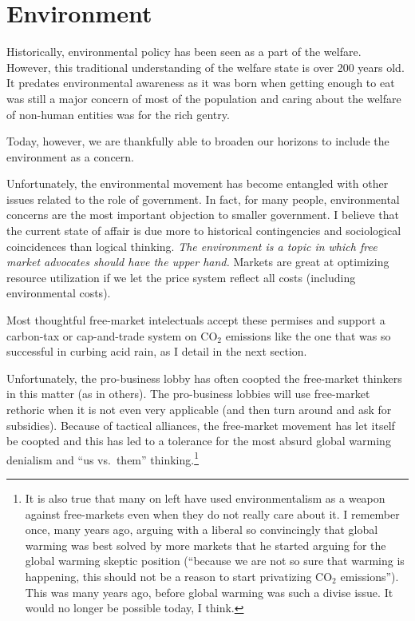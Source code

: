 \chapter{Environment}
\label{chpt:environment}

Historically, environmental policy has been seen as a part of the welfare.
However, this traditional understanding of the welfare state is over 200 years
old. It predates environmental awareness as it was born when getting enough to
eat was still a major concern of most of the population and caring about the
welfare of non-human entities was for the rich gentry.

Today, however, we are thankfully able to broaden our horizons to include the
environment as a concern.

Unfortunately, the environmental movement has become entangled with other
issues related to the role of government.  In fact, for many people,
environmental concerns are the most important objection to smaller government.
I believe that the current state of affair is due more to historical
contingencies and sociological coincidences than logical thinking. \emph{The
environment is a topic in which free market advocates should have the upper
hand.} Markets are great at optimizing resource utilization if we let the price
system reflect all costs (including environmental costs).

Most thoughtful free-market intelectuals accept these permises and support a
carbon-tax or cap-and-trade system on CO$_2$ emissions like the one that was so
successful in curbing acid rain, as I detail in the next section.

Unfortunately, the pro-business lobby has often coopted the free-market
thinkers in this matter (as in others). The pro-business lobbies will use
free-market rethoric when it is not even very applicable (and then turn around
and ask for subsidies). Because of tactical alliances, the free-market movement
has let itself be coopted and this has led to a tolerance for the most absurd
global warming denialism and ``us vs.\ them'' thinking.\footnote{It is also
true that many on left have used environmentalism as a weapon against
free-markets even when they do not really care about it. I remember once, many
years ago, arguing with a liberal so convincingly that global warming was best
solved by more markets that he started arguing for the global warming skeptic
position (``because we are not so sure that warming is happening, this should
not be a reason to start privatizing CO${}_2$ emissions''). This was many years
ago, before global warming was such a divise issue. It would no longer be
possible today, I think.}

